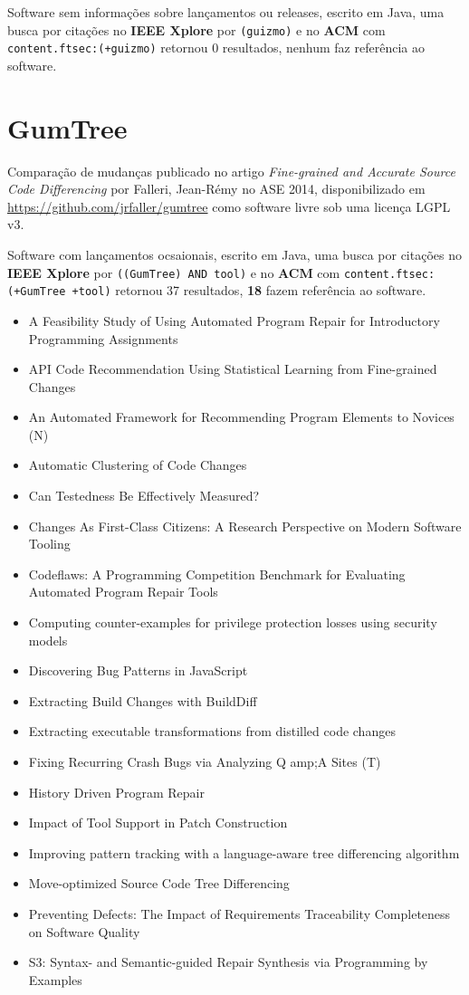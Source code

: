 Software sem informações sobre lançamentos ou releases,
escrito em Java,
uma busca por citações no {\bf IEEE Xplore} por
\texttt{(guizmo)}
e no {\bf ACM} com
\texttt{content.ftsec:(+guizmo)}
retornou
0 resultados,
nenhum faz referência ao software.



\section{GumTree}

Comparação de mudanças
publicado no artigo {\it Fine-grained and Accurate Source Code Differencing}
por Falleri, Jean-R{\'e}my
no ASE 2014,
disponibilizado em \url{https://github.com/jrfaller/gumtree}
como software livre
sob uma licença LGPL v3.

Software com lançamentos ocsaionais,
escrito em Java,
uma busca por citações no {\bf IEEE Xplore} por
\texttt{((GumTree) AND tool)}
e no {\bf ACM} com
\texttt{content.ftsec:(+GumTree +tool)}
retornou
37 resultados,
{\bf 18} fazem referência ao software.

\begin{itemize}
\item A Feasibility Study of Using Automated Program Repair for Introductory Programming Assignments
\item API Code Recommendation Using Statistical Learning from Fine-grained Changes
\item An Automated Framework for Recommending Program Elements to Novices (N)
\item Automatic Clustering of Code Changes
\item Can Testedness Be Effectively Measured?
\item Changes As First-Class Citizens: A Research Perspective on Modern Software Tooling
\item Codeflaws: A Programming Competition Benchmark for Evaluating Automated Program Repair Tools
\item Computing counter-examples for privilege protection losses using security models
\item Discovering Bug Patterns in JavaScript
\item Extracting Build Changes with BuildDiff
\item Extracting executable transformations from distilled code changes
\item Fixing Recurring Crash Bugs via Analyzing Q amp;A Sites (T)
\item History Driven Program Repair
\item Impact of Tool Support in Patch Construction
\item Improving pattern tracking with a language-aware tree differencing algorithm
\item Move-optimized Source Code Tree Differencing
\item Preventing Defects: The Impact of Requirements Traceability Completeness on Software Quality
\item S3: Syntax- and Semantic-guided Repair Synthesis via Programming by Examples
\end{itemize}


